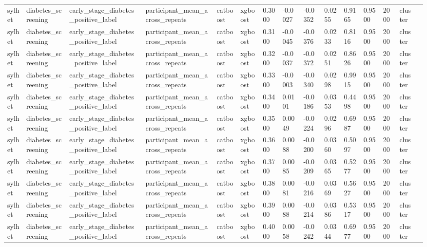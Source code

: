 \begin{tabular}{lllllllllllllll}
sylhet & diabetes\_screening & early\_stage\_diabetes\_positive\_label & participant\_mean\_across\_repeats & catboost & xgboost & 0.3000 & -0.0027 & -0.0352 & 0.0255 & 0.9165 & 0.9500 & 2000 & cluster &  \\
sylhet & diabetes\_screening & early\_stage\_diabetes\_positive\_label & participant\_mean\_across\_repeats & catboost & xgboost & 0.3100 & -0.0045 & -0.0376 & 0.0233 & 0.8116 & 0.9500 & 2000 & cluster &  \\
sylhet & diabetes\_screening & early\_stage\_diabetes\_positive\_label & participant\_mean\_across\_repeats & catboost & xgboost & 0.3200 & -0.0037 & -0.0372 & 0.0251 & 0.8626 & 0.9500 & 2000 & cluster &  \\
sylhet & diabetes\_screening & early\_stage\_diabetes\_positive\_label & participant\_mean\_across\_repeats & catboost & xgboost & 0.3300 & -0.0003 & -0.0340 & 0.0298 & 0.9915 & 0.9500 & 2000 & cluster &  \\
sylhet & diabetes\_screening & early\_stage\_diabetes\_positive\_label & participant\_mean\_across\_repeats & catboost & xgboost & 0.3400 & 0.0101 & -0.0186 & 0.0353 & 0.4498 & 0.9500 & 2000 & cluster &  \\
sylhet & diabetes\_screening & early\_stage\_diabetes\_positive\_label & participant\_mean\_across\_repeats & catboost & xgboost & 0.3500 & 0.0049 & -0.0224 & 0.0296 & 0.6987 & 0.9500 & 2000 & cluster &  \\
sylhet & diabetes\_screening & early\_stage\_diabetes\_positive\_label & participant\_mean\_across\_repeats & catboost & xgboost & 0.3600 & 0.0088 & -0.0200 & 0.0360 & 0.5097 & 0.9500 & 2000 & cluster &  \\
sylhet & diabetes\_screening & early\_stage\_diabetes\_positive\_label & participant\_mean\_across\_repeats & catboost & xgboost & 0.3700 & 0.0085 & -0.0209 & 0.0365 & 0.5277 & 0.9500 & 2000 & cluster &  \\
sylhet & diabetes\_screening & early\_stage\_diabetes\_positive\_label & participant\_mean\_across\_repeats & catboost & xgboost & 0.3800 & 0.0081 & -0.0216 & 0.0369 & 0.5627 & 0.9500 & 2000 & cluster &  \\
sylhet & diabetes\_screening & early\_stage\_diabetes\_positive\_label & participant\_mean\_across\_repeats & catboost & xgboost & 0.3900 & 0.0088 & -0.0214 & 0.0386 & 0.5317 & 0.9500 & 2000 & cluster &  \\
sylhet & diabetes\_screening & early\_stage\_diabetes\_positive\_label & participant\_mean\_across\_repeats & catboost & xgboost & 0.4000 & 0.0058 & -0.0242 & 0.0344 & 0.6977 & 0.9500 & 2000 & cluster &  \\

\end{tabular}
